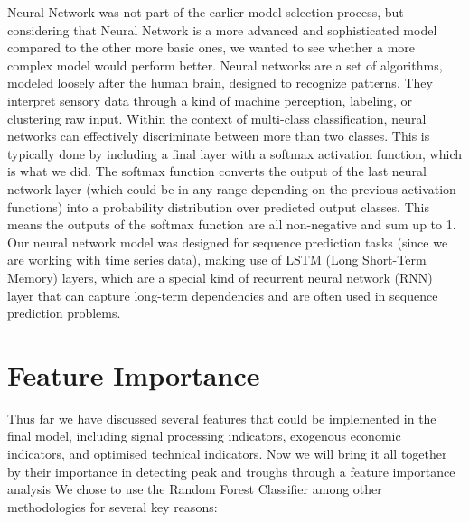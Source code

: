 \documentclass{article}
\begin{document}
Neural Network was not part of the earlier model selection process, but considering that Neural Network is a more advanced and sophisticated model compared to the other more basic ones, we wanted to see whether a more complex model would perform better.
\newline
\newline
Neural networks are a set of algorithms, modeled loosely after the human brain, designed to recognize patterns. They interpret sensory data through a kind of machine perception, labeling, or clustering raw input.
\newline
\newline
Within the context of multi-class classification, neural networks can effectively discriminate between more than two classes. This is typically done by including a final layer with a softmax activation function, which is what we did. The softmax function converts the output of the last neural network layer (which could be in any range depending on the previous activation functions) into a probability distribution over predicted output classes. This means the outputs of the softmax function are all non-negative and sum up to 1.
\newline
\newline
Our neural network model was designed for sequence prediction tasks (since we are working with time series data), making use of LSTM (Long Short-Term Memory) layers, which are a special kind of recurrent neural network (RNN) layer that can capture long-term dependencies and are often used in sequence prediction problems.

\section{Feature Importance}

Thus far we have discussed several features that could be implemented in the final model, including signal processing indicators, exogenous economic indicators, and optimised technical indicators. Now we will bring it all together by their importance in detecting peak and troughs through a feature importance analysis
\newline
\newline
We chose to use the Random Forest Classifier among other methodologies for several key reasons:
\end{document}
